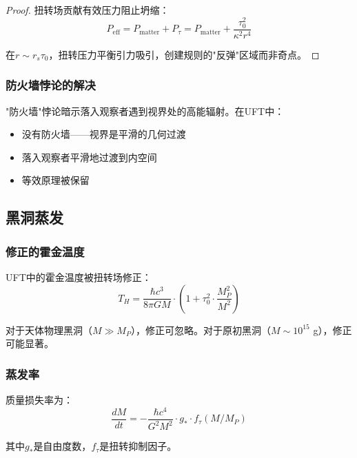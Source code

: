 \begin{proof}
扭转场贡献有效压力阻止坍缩：
\begin{equation}
    P_{\text{eff}} = P_{\text{matter}} + P_{\tau} = P_{\text{matter}} + \frac{\tau_0^2}{\kappa^2 r^4}
\end{equation}

在$r \sim r_s \tau_0$，扭转压力平衡引力吸引，创建规则的"反弹"区域而非奇点。
\end{proof}

\subsubsection{防火墙悖论的解决}

"防火墙"悖论暗示落入观察者遇到视界处的高能辐射。在UFT中：
\begin{itemize}
    \item 没有防火墙——视界是平滑的几何过渡
    \item 落入观察者平滑地过渡到内空间
    \item 等效原理被保留
\end{itemize}

\subsection{黑洞蒸发}

\subsubsection{修正的霍金温度}

UFT中的霍金温度被扭转场修正：
\begin{equation}
    T_H = \frac{\hbar c^3}{8\pi G M} \cdot \left(1 + \tau_0^2 \cdot \frac{M_P^2}{M^2}\right)
\end{equation}

对于天体物理黑洞（$M \gg M_P$），修正可忽略。对于原初黑洞（$M \sim 10^{15}$ g），修正可能显著。

\subsubsection{蒸发率}

质量损失率为：
\begin{equation}
    \frac{dM}{dt} = -\frac{\hbar c^4}{G^2 M^2} \cdot g_* \cdot f_\tau(M/M_P)
\end{equation}

其中$g_*$是自由度数，$f_\tau$是扭转抑制因子。

